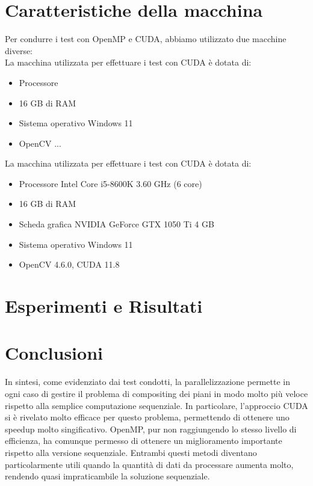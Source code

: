 \documentclass[11pt]{article}
\begin{document}
    \section{Caratteristiche della macchina}\label{sec:caratteristiche-della-macchina}
    Per condurre i test con OpenMP e CUDA, abbiamo utilizzato due macchine diverse:\\
    La macchina utilizzata per effettuare i test con CUDA è dotata di:
    \begin{itemize}
        \item Processore
        \item 16 GB di RAM
        \item Sistema operativo Windows 11
        \item OpenCV ...
    \end{itemize}
    La macchina utilizzata per effettuare i test con CUDA è dotata di:
    \begin{itemize}
        \item Processore Intel Core i5-8600K 3.60 GHz (6 core)
        \item 16 GB di RAM
        \item Scheda grafica NVIDIA GeForce GTX 1050 Ti 4 GB
        \item Sistema operativo Windows 11
        \item OpenCV 4.6.0, CUDA 11.8
    \end{itemize}

    \section{Esperimenti e Risultati}\label{sec:tests}
    

    \section{Conclusioni}\label{sec:conclusioni}
    In sintesi, come evidenziato dai test condotti, la parallelizzazione permette in ogni caso di gestire il problema di compositing dei piani in modo molto più veloce rispetto alla semplice computazione sequenziale.
    In particolare, l'approccio CUDA si è rivelato molto efficace per questo problema, permettendo di ottenere uno speedup molto singificativo.
    OpenMP, pur non raggiungendo lo stesso livello di efficienza, ha comunque permesso di ottenere un miglioramento importante rispetto alla versione sequenziale.
    Entrambi questi metodi diventano particolarmente utili quando la quantità di dati da processare aumenta molto, rendendo quasi impraticambile la soluzione sequenziale.

    \appendix
    
\end{document}
